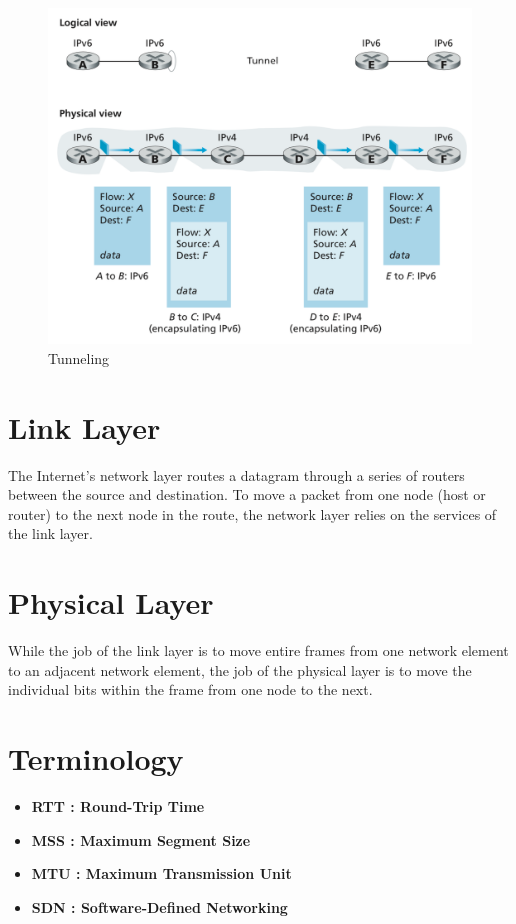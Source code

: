 \documentclass[11pt]{article}
\begin{document}
\begin{figure}[h]
	\centering
	\includegraphics[width=0.8\linewidth]{images/Tunneling.png}
	\caption{Tunneling}
	\label{fig:Tunneling}
\end{figure}




















\newpage

\section{Link Layer}

The Internet’s network layer routes a datagram through a series of routers between the source and destination. To move a packet from one node (host or router) to the next node in the route, the network layer relies on the services of the link layer.

\section{Physical Layer}

While the job of the link layer is to move entire frames from one network element to an adjacent network element, the job of the physical layer is to move the individual bits within the frame from one node to the next.



\section{Terminology}

\begin{itemize}

	\item \textbf{RTT : Round-Trip Time}
	
	\item \textbf{MSS : Maximum Segment Size}
	
	\item \textbf{MTU : Maximum Transmission Unit}
	
	\item \textbf{SDN : Software-Defined Networking}

\end{itemize}
\end{document}
